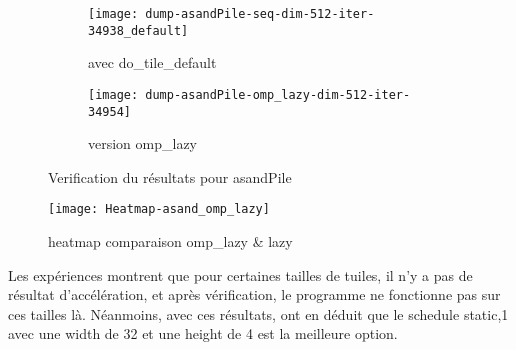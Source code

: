 \documentclass[10pt, a4paper]{article}
\begin{document}
\begin{figure}[H]
    \centering
    \begin{subfigure}{.4\textwidth}
        \texttt{[image: dump-asandPile-seq-dim-512-iter-34938\_default]}
        \caption{\small{avec do\_tile\_default}}
    \end{subfigure}
    \begin{subfigure}{.4\textwidth}
        \texttt{[image: dump-asandPile-omp\_lazy-dim-512-iter-34954]}
        \caption{\small{version omp\_lazy}}
    \end{subfigure}
    \caption{Verification du résultats pour asandPile}
\end{figure}

\begin{figure}[H]
    \centering
    \texttt{[image: Heatmap-asand\_omp\_lazy]}
    \caption{\small{heatmap comparaison omp\_lazy \& lazy}}
\end{figure}

Les expériences montrent que pour certaines tailles de tuiles, il n'y a pas de résultat d'accélération,
et après vérification, le programme ne fonctionne pas sur ces tailles là.
Néanmoins, avec ces résultats, ont en déduit que le schedule static,1 avec une width de 32 et
une height de 4 est la meilleure option.
\end{document}
